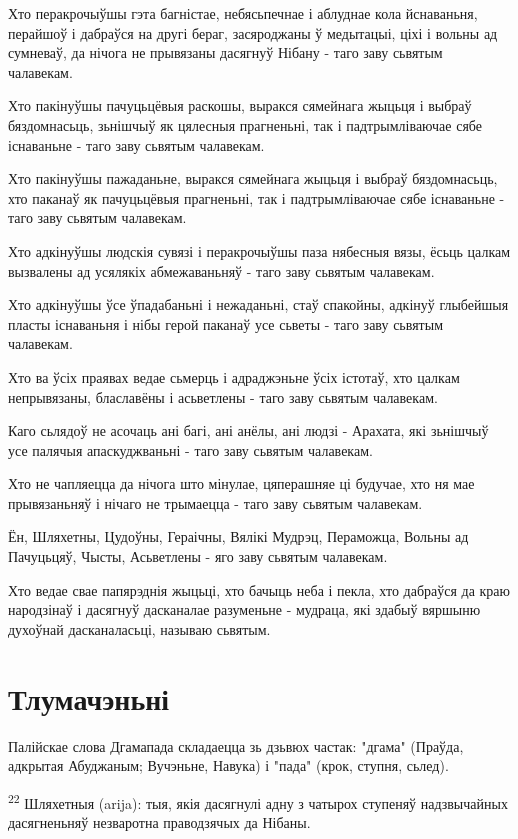 \documentclass{article}
\begin{document}
Хто перакрочыўшы гэта багністае, небясьпечнае і аблуднае кола
йснаваньня, перайшоў і дабраўся на другі бераг, засяроджаны ў медытацыі,
ціхі і вольны ад сумневаў, да нічога не прывязаны дасягнуў Нібану - таго
заву сьвятым чалавекам.

Хто пакінуўшы пачуцьцёвыя раскошы, выракся сямейнага жыцьця і
выбраў бяздомнасьць, зьнішчыў як цялесныя прагненьні, так і
падтрымліваючае сябе існаваньне - таго заву сьвятым чалавекам.

Хто пакінуўшы пажаданьне, выракся сямейнага жыцьця і выбраў
бяздомнасьць, хто паканаў як пачуцьцёвыя прагненьні, так і
падтрымліваючае сябе існаваньне - таго заву сьвятым чалавекам.

Хто адкінуўшы людскія сувязі і перакрочыўшы паза нябесныя вязы,
ёсьць цалкам вызвалены ад усялякіх абмежаваньняў - таго заву сьвятым
чалавекам.

Хто адкінуўшы ўсе ўпадабаньні і нежаданьні, стаў спакойны, адкінуў
глыбейшыя пласты існаваньня і нібы герой паканаў усе сьветы - таго заву
сьвятым чалавекам.

Хто ва ўсіх праявах ведае сьмерць і адраджэньне ўсіх істотаў, хто
цалкам непрывязаны, блаславёны і асьветлены - таго заву сьвятым
чалавекам.

Каго сьлядоў не асочаць ані багі, ані анёлы, ані людзі - Арахата,
які зьнішчыў усе палячыя апаскуджваньні - таго заву сьвятым чалавекам.

Хто не чапляецца да нічога што мінулае, цяперашняе ці будучае, хто
ня мае прывязаньняў і нічаго не трымаецца - таго заву сьвятым чалавекам.

Ён, Шляхетны, Цудоўны, Гераічны, Вялікі Мудрэц, Пераможца, Вольны
ад Пачуцьцяў, Чысты, Асьветлены - яго заву сьвятым чалавекам.

Хто ведае свае папярэднія жыцьці, хто бачыць неба і пекла, хто
дабраўся да краю народзінаў і дасягнуў дасканалае разуменьне - мудраца,
які здабыў вяршыню духоўнай дасканаласьці, называю сьвятым.

\section{Тлумачэньні}

Палійскае слова Дгамапада складаецца зь дзьвюх частак: "дгама" (Праўда,
адкрытая Абуджаным; Вучэньне, Навука) і "пада" (крок, ступня, сьлед).

\textsuperscript{22} Шляхетныя (arija): тыя, якія дасягнулі адну з
чатырох ступеняў надзвычайных дасягненьняў незваротна праводзячых да
Нібаны.
\end{document}
